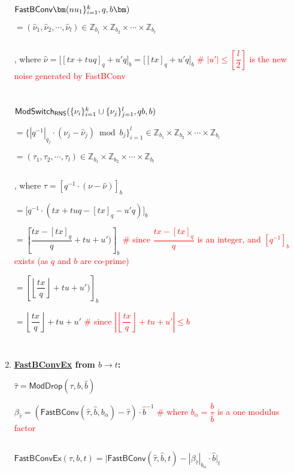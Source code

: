 \begin{enumerate}
$ $

$\textsf{FastBConv}\bm(\\nu_1\}_{i=1}^{k}, q, b\bm)$

$ = (\hat\nu_1, \hat\nu_2, \cdots, \hat\nu_l) \in \mathbb{Z}_{b_1} \times \mathbb{Z}_{b_2} \times \cdots \times \mathbb{Z}_{b_l}$ 

$ $

, where $\hat\nu = \Big[[tx + tuq]_{q} + u'q\Big]_b = \Big[[tx]_{q} + u'q\Big]_b$ \textcolor{red}{\# $|u'| \leq [\dfrac{l}{2}]$ is the new noise generated by \textsf{FastBConv}}

$ $

$ $

$\textsf{ModSwitch\textsubscript{RNS}}(\{\nu_i\}_{i=1}^k \cup \{\nu_j\}_{j=1}^l, qb, b)$

$ = \{|q^{-1}|_{q_j} \cdot (\nu_j - \hat{\nu}_j) \bmod b_j\}_{i=1}^{l} \in \mathbb{Z}_{b_1} \times \mathbb{Z}_{b_2} \times \cdots \times \mathbb{Z}_{b_l}$ 

$ = (\tau_1, \tau_2, \cdots, \tau_l) \in \mathbb{Z}_{b_1} \times \mathbb{Z}_{b_2} \times \cdots \times \mathbb{Z}_{b_l}$

$ $

, where $\tau = [q^{-1}\cdot(\nu - \hat{\nu})]_b$

$= \Big[q^{-1}\cdot(tx + tuq - [tx]_{q} - u'q)\Big]_b$

$ = \left[\dfrac{tx - [tx]_{q}}{q} + tu + u')\right]_b$ \textcolor{red}{ \# since $\dfrac{tx - [tx]_{q}}{q}$ is an integer, and $[q^{-1}]_b$ exists (as $q$ and $b$ are co-prime)}

$ = \left[\left\lfloor\dfrac{tx}{q}\right\rfloor + tu + u')\right]_b$

$ = \left\lfloor\dfrac{tx}{q}\right\rfloor + tu + u'$ \textcolor{red}{ \# since $\left|\left\lfloor\dfrac{tx}{q}\right\rfloor + tu + u'\right| \leq b$}


$ $

$ $

\item \textbf{\underline{\textsf{FastBConvEx}} from $b \rightarrow t$:} 

$\hat{\tau} = \textsf{ModDrop}(\tau, b, \hat{b})$ 

$\beta_{\hat{\tau}} = (\textsf{FastBConv}(\hat{\tau}, \hat{b}, b_\alpha) - \hat{\tau})\cdot \hat{b}^{-1}$ \textcolor{red}{ \# where $b_\alpha = \dfrac{b}{\hat b}$ is a one modulus factor}

$ $

$\textsf{FastBConvEx}(\tau, b, t) = \Big|\textsf{FastBConv}(\hat{\tau}, \hat{b}, t) - |\beta_{\hat{\tau}}|_{b_{\alpha}} \cdot\hat{b}\Big|_t $


\end{enumerate}
